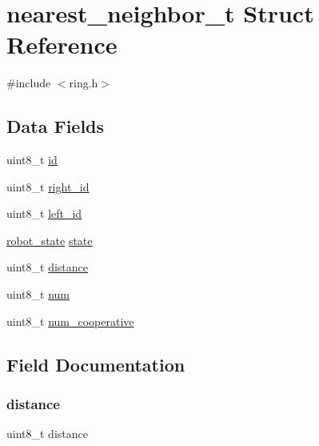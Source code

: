 \hypertarget{structnearest__neighbor__t}{}\section{nearest\+\_\+neighbor\+\_\+t Struct Reference}
\label{structnearest__neighbor__t}


{\ttfamily \#include $<$ring.\+h$>$}

\subsection*{Data Fields}
\begin{DoxyCompactItemize}
\item 
uint8\+\_\+t \hyperlink{structnearest__neighbor__t_a1e6927fa1486224044e568f9c370519b}{id}
\item 
uint8\+\_\+t \hyperlink{structnearest__neighbor__t_ad5aa37b153f535af1fc07cf153ea8b75}{right\+\_\+id}
\item 
uint8\+\_\+t \hyperlink{structnearest__neighbor__t_a4d823b5e183e24190a16da36f00a46fb}{left\+\_\+id}
\item 
\hyperlink{ring_8h_a69b20b1a04c8e4cf3b72851b966259ec}{robot\+\_\+state} \hyperlink{structnearest__neighbor__t_aadbb2fcd5b6edab38e3aa5aca6d92439}{state}
\item 
uint8\+\_\+t \hyperlink{structnearest__neighbor__t_a99ae28d976be4f4b3aada22693153bea}{distance}
\item 
uint8\+\_\+t \hyperlink{structnearest__neighbor__t_abea371f9030e15a5d2a4c181576833d8}{num}
\item 
uint8\+\_\+t \hyperlink{structnearest__neighbor__t_ae24749d410d070a1979d9119a2f67147}{num\+\_\+cooperative}
\end{DoxyCompactItemize}


\subsection{Field Documentation}
\mbox{\label{structnearest__neighbor__t_a99ae28d976be4f4b3aada22693153bea}} 
\subsubsection{\texorpdfstring{distance}{distance}}
{\footnotesize\ttfamily uint8\+\_\+t distance}

